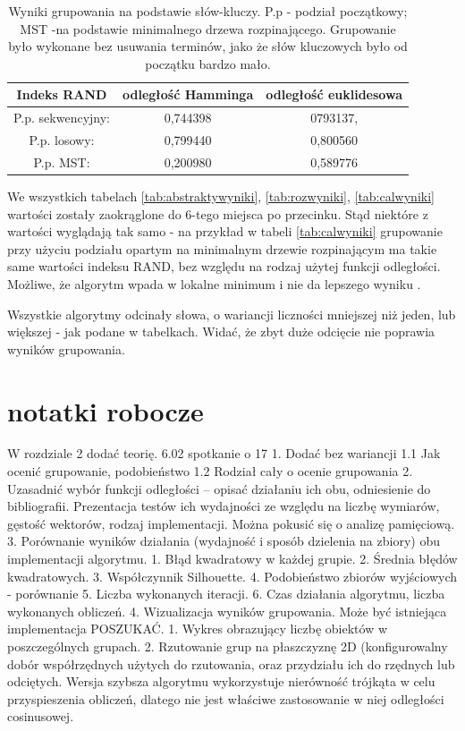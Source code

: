 \documentclass{article}
\begin{document}
\begin{table}[H]
	\centering
	\begin{tabular}{c|c|c}
		Indeks RAND & odległość Hamminga & odległość euklidesowa \\ \hline
		P.p. sekwencyjny: & 0,744398 & 0793137, \\ \hline
		P.p. losowy: & 0,799440 & 0,800560  \\ \hline
		P.p. MST: & 0,200980 & 0,589776 
	\end{tabular}
	\caption{Wyniki grupowania na podstawie słów-kluczy. P.p - podział początkowy; MST -na podstawie minimalnego drzewa rozpinającego. Grupowanie było wykonane bez usuwania terminów, jako że słów kluczowych było od początku bardzo mało.}
	\label{tab:keywordswyniki}
\end{table}

We wszystkich tabelach \ref{tab:abstraktywyniki}, \ref{tab:rozwyniki}, \ref{tab:calwyniki} wartości zostały zaokrąglone do 6-tego miejsca po przecinku. Stąd niektóre z wartości wyglądają tak samo - na przykład w tabeli \ref{tab:calwyniki} grupowanie przy użyciu podziału opartym na minimalnym drzewie rozpinającym ma takie same wartości indeksu RAND, bez względu na rodzaj użytej funkcji odległości. Możliwe, że algorytm wpada w lokalne minimum i nie da lepszego wyniku . 

Wszystkie algorytmy odcinały słowa, o wariancji liczności mniejszej niż jeden, lub większej - jak podane w tabelkach. Widać, że zbyt duże odcięcie nie poprawia wyników grupowania.

\newpage
\section{notatki robocze}
W rozdziale 2 dodać teorię.
	6.02 spotkanie o 17
	1. Dodać bez wariancji
	1.1 Jak ocenić grupowanie, podobieństwo
	1.2 Rodział cały o ocenie grupowania
	2. Uzasadnić wybór funkcji odległości – opisać działaniu ich obu, odniesienie do bibliografii. Prezentacja testów ich wydajności ze względu na liczbę wymiarów, gęstość wektorów, rodzaj implementacji. Można pokusić się o analizę pamięciową.
	3. Porównanie wyników działania (wydajność i sposób dzielenia na zbiory) obu implementacji algorytmu.
	1. Błąd kwadratowy w każdej grupie. 
	2. Średnia błędów kwadratowych.
	3. Współczynnik Silhouette.
	4. Podobieństwo zbiorów wyjściowych - porównanie
	5. Liczba wykonanych iteracji.
	6. Czas działania algorytmu, liczba wykonanych obliczeń.
	4. Wizualizacja wyników grupowania. Może być istniejąca implementacja POSZUKAĆ.
	1. Wykres obrazujący liczbę obiektów w poszczególnych grupach.
	2. Rzutowanie grup na płaszczyznę 2D (konfigurowalny dobór współrzędnych użytych do rzutowania, oraz przydziału ich do rzędnych lub odciętych.
	Wersja szybsza algorytmu wykorzystuje nierówność trójkąta w celu przyspieszenia obliczeń, dlatego nie jest właściwe zastosowanie w niej odległości cosinusowej.
	
\end{document}
